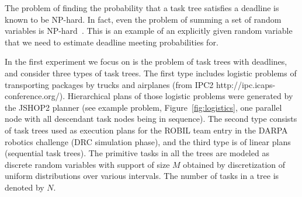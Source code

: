 \documentclass{article}
\begin{document}
The problem of finding the probability that a task tree satisfies a deadline is known to be NP-hard. In fact, even the problem of summing a set of random variables is NP-hard~\cite{mohring2001scheduling}. This is an example of an explicitly given random variable that we need to estimate deadline meeting probabilities for.

In the first experiment we focus on is the problem of task trees with deadlines, and consider three types of task trees. The first type includes logistic problems of transporting packages by trucks and airplanes (from IPC2 http://ipc.icaps-conference.org/). Hierarchical plans of those logistic problems were generated by the JSHOP2 planner \cite{nau2003shop2} (see example problem, Figure~\ref{fig:logistics}, one parallel node with all descendant task nodes being in sequence). 
The second type consists of task trees used as execution plans for the ROBIL team entry in the DARPA robotics challenge (DRC simulation phase), and the third type is of linear plans (sequential task trees).
The primitive tasks in all the trees are modeled as discrete random variables with support of size $M$ obtained by discretization of uniform distributions over various intervals. The number of tasks in a tree is denoted by $N$. 
\end{document}
